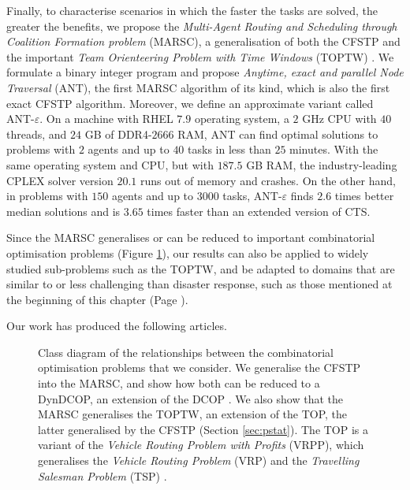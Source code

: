 Finally, to characterise scenarios in which the faster the tasks are solved, the greater
the benefits, we propose the \emph{Multi-Agent Routing and Scheduling through Coalition
Formation problem} (MARSC), a generalisation of both the CFSTP and the important
\emph{Team Orienteering Problem with Time Windows} (TOPTW) \cite{top2019}. We formulate a
binary integer program \cite{wolsey2020} and propose \emph{Anytime, exact and parallel
Node Traversal} (ANT), the first MARSC algorithm of its kind, which is also the first
exact CFSTP algorithm. Moreover, we define an approximate variant called
ANT-$\varepsilon$.
On a machine with RHEL $7.9$ operating system, a $2$ GHz CPU with $40$ threads, and $24$
GB of DDR4-$2666$ RAM, ANT can find optimal solutions to problems with $2$ agents and up
to $40$ tasks in less than $25$ minutes. With the same operating system and CPU, but with
$187.5$ GB RAM, the industry-leading CPLEX solver version $20.1$ runs out of memory and
crashes. On the other hand, in problems with $150$ agents and up to $3000$ tasks,
ANT-$\varepsilon$ finds $2.6$ times better median solutions and is $3.65$ times faster
than an extended version of CTS.

Since the MARSC generalises or can be reduced to important combinatorial
optimisation problems (Figure \ref{fig:relationships}), our results can also be applied to
widely studied sub-problems such as the TOPTW, and be adapted to domains that are similar
to or less challenging than disaster response, such as those mentioned at the beginning of
this chapter (Page \pageref{chap:intro}).

Our work has produced the following articles.
\clearpage

\begin{figure}[t]
    \centering
    \begin{adjustbox}{width=.7\textwidth}
        
    \end{adjustbox}
    \caption[Class diagram of the problems considered]{Class diagram of the
    relationships between the combinatorial optimisation problems that we consider.
    We generalise the CFSTP into the MARSC, and show how both can be reduced
    to a DynDCOP, an extension of the DCOP \cite{fioretto2018survey}. We also show
    that the MARSC generalises the TOPTW, an extension of the TOP, the latter
    generalised by the CFSTP (Section \ref{sec:pstat}). The TOP is a variant of the
    \emph{Vehicle Routing Problem with Profits} (VRPP), which generalises the
    \emph{Vehicle Routing Problem} (VRP) and the \emph{Travelling Salesman
    Problem} (TSP) \cite{top2019}.}
    \label{fig:relationships}
\end{figure}

